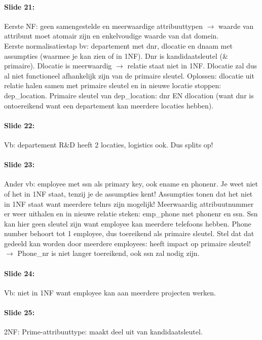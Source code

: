 \documentclass[10pt,a4paper]{report}
\begin{document}
\paragraph{Slide 21:}Eerste NF: geen samengestelde en meerwaardige attribuuttypen $\rightarrow$ waarde van attribuut moet atomair zijn en enkelvoudige waarde van dat domein.\\
Eerste normalisatiestap bv: departement met dnr, dlocatie en dnaam met assumpties (waarmee je kan zien of in 1NF). Dnr is kandidaatsleutel (\& primaire). Dlocatie is meerwaardig $\rightarrow$ relatie staat niet in 1NF. Dlocatie zal dus al niet functioneel afhankelijk zijn van de primaire sleutel. Oplossen: dlocatie uit relatie halen samen met primaire sleutel en in nieuwe locatie stoppen: dep\_location. Primaire sleutel van dep\_location: dnr EN dlocation (want dnr is ontoereikend want een departement kan meerdere locaties hebben). 

\paragraph{Slide 22:}Vb: departement R\&D heeft 2 locaties, logistics ook. Dus splits op!

\paragraph{Slide 23:}Ander vb: employee met ssn als primary key, ook ename en phonenr. Je weet niet of het in 1NF staat, tenzij je de assumpties kent! Assumpties tonen dat het niet in 1NF staat want meerdere telnrs zijn mogelijk! Meerwaardig attribuutnummer er weer uithalen en in nieuwe relatie steken: emp\_phone met phonenr en ssn. Ssn kan hier geen sleutel zijn want employee kan meerdere telefoons hebben. Phone number behoort tot 1 employee, dus toereikend als primaire sleutel.
Stel dat dat gedeeld kan worden door meerdere employees: heeft impact op primaire sleutel! $\rightarrow$ Phone\_nr is niet langer toereikend, ook ssn zal nodig zijn.

\paragraph{Slide 24:}Vb: niet in 1NF want employee kan aan meerdere projecten werken.

\paragraph{Slide 25:}2NF: Prime-attribuuttype: maakt deel uit van kandidaatsleutel.
\end{document}
